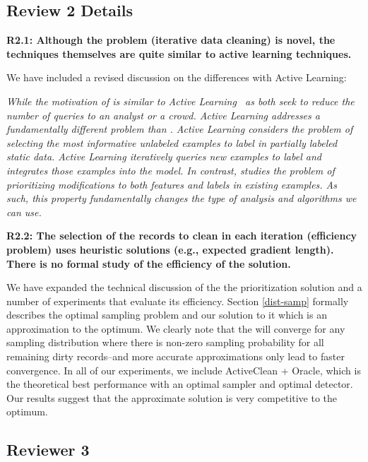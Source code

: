 \subsection*{Review 2 Details}

\noindent\textbf{R2.1: Although the problem (iterative data cleaning) is novel, the techniques themselves are quite similar to active learning techniques.}

\noindent  We have included a revised discussion on the differences with Active Learning:

\emph{While the motivation of \sys is similar to Active Learning~\cite{DBLP:journals/pvldb/YakoutENOI11,gokhale2014corleone} as both seek to reduce the number of queries to an analyst or a crowd.
Active Learning addresses a fundamentally different problem than \sys.
Active Learning considers the problem of selecting the most informative unlabeled examples to label in partially labeled static data.
Active Learning iteratively queries new examples to label and integrates those examples into the model.
In contrast, \sys studies the problem of prioritizing modifications to both features and labels in existing examples.
As such, this property fundamentally changes the type of analysis and algorithms we can use.}

\vspace{0.5em}

\noindent\textbf{R2.2: The selection of the records to clean in each iteration (efficiency problem) uses heuristic solutions (e.g., expected gradient length). There is no formal study of the efficiency of the solution.}

\noindent  We have expanded the technical discussion of the the prioritization solution and a number of experiments that evaluate its efficiency. Section \ref{dist-samp} formally describes the optimal sampling problem and our solution to it which is an approximation to the optimum. We clearly note that the \sys will converge for any sampling distribution where there is non-zero sampling probability for all remaining dirty records--and more accurate approximations only lead to faster convergence. In all of our experiments, we include ActiveClean + Oracle, which is the theoretical best performance with an optimal sampler and optimal detector.
Our results suggest that the approximate solution is very competitive to the optimum. 

 \subsection*{Reviewer 3}

